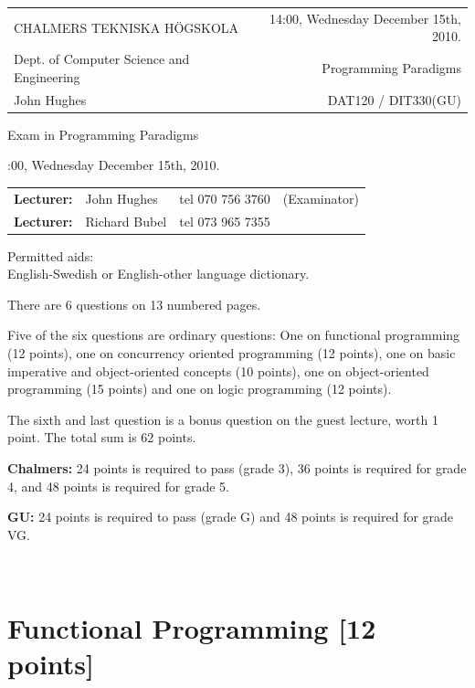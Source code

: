 \documentclass{article}
\begin{document}
\newcommand{\examtime}{14:00, Wednesday December 15th, 2010}
\newcommand{\points}[1]{\marginpar{\bf #1 points}}
\noindent
\begin{tabular}{lr}
CHALMERS TEKNISKA H\"OGSKOLA &\examtime{}.\\
Dept. of Computer Science and Engineering & Programming Paradigms\\
John Hughes                  & DAT120 / DIT330(GU) \\
\end{tabular}

\vspace{2.5cm} \noindent
\begin{center} {\LARGE
Exam in Programming Paradigms}
\end{center}

\vspace{1.5cm}

\noindent
\examtime{}.\\
\begin{tabular}{lllc}
\textbf{Lecturer:} &  John Hughes  & tel 070 756 3760 & (Examinator)\\
\textbf{Lecturer:} & Richard Bubel & tel 073 965 7355 & \\ 
\end{tabular}
\vspace{1cm}

\noindent
Permitted aids:\\
English-Swedish or English-other language dictionary.

There are 6 questions on 13 numbered pages. 

Five of the six questions are ordinary questions: One on functional
programming (12 points), one on concurrency oriented programming (12
points), one on basic imperative and object-oriented concepts (10
points), one on object-oriented programming (15 points) and one on
logic programming (12 points).

The sixth and last question is a bonus question on the guest lecture,
worth 1 point. The total sum is 62 points.


\textbf{Chalmers:}
24 points is required to pass (grade 3), 36 points is required for
grade 4, and 48 points is required for grade 5. 

\textbf{GU:}
24 points is required to pass (grade G) and 48 points is required for
grade VG.


\newpage 
\hfill\\
\newpage

\section{Functional Programming [12 points]}
\end{document}
